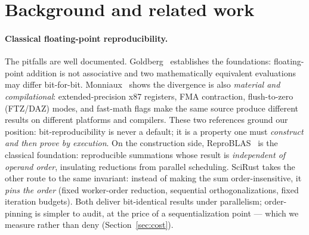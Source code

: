 \documentclass[sigconf,review]{acmart}
\begin{document}
\section{Background and related work}
\label{sec:related}

\paragraph{Classical floating-point reproducibility.}
The pitfalls are well documented. Goldberg~\cite{goldberg1991} establishes
the foundations: floating-point addition is not associative and two
mathematically equivalent evaluations may differ bit-for-bit.
Monniaux~\cite{monniaux2008} shows the divergence is also \emph{material and
compilational}: extended-precision x87 registers, FMA contraction,
flush-to-zero (FTZ/DAZ) modes, and fast-math flags make the same source
produce different results on different platforms and compilers. These two
references ground our position: bit-reproducibility is never a default; it
is a property one must \emph{construct and then prove by execution}. On the
construction side, ReproBLAS~\cite{demmel2013} is the classical foundation:
reproducible summations whose result is \emph{independent of operand
order}, insulating reductions from parallel scheduling. SciRust takes the
other route to the same invariant: instead of making the sum
order-insensitive, it \emph{pins the order} (fixed worker-order reduction,
sequential orthogonalizations, fixed iteration budgets). Both deliver
bit-identical results under parallelism; order-pinning is simpler to audit,
at the price of a sequentialization point --- which we measure rather than
deny (Section~\ref{sec:cost}).
\end{document}
